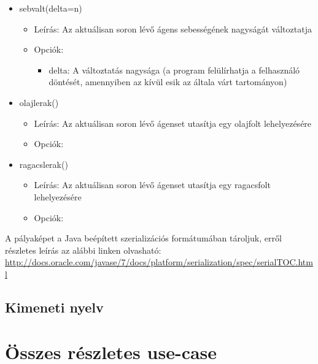 \begin{itemize}
    \item sebvalt(delta=n)
    \begin{itemize}
        \item Leírás: Az aktuálisan soron lévő ágens sebességének nagyságát változtatja
        \item Opciók: 
            \begin{itemize}
                \item delta: A változtatás nagysága (a program felülírhatja a felhasználó döntését, amennyiben az kívül esik az általa várt tartományon) 
            \end{itemize}
    \end{itemize}

    \item olajlerak()
    \begin{itemize}
        \item Leírás: Az aktuálisan soron lévő ágenset utasítja egy olajfolt lehelyezésére
        \item Opciók: 
    \end{itemize}

    \item ragacslerak()
    \begin{itemize}
        \item Leírás: Az aktuálisan soron lévő ágenset utasítja egy ragacsfolt lehelyezésére
        \item Opciók: 
    \end{itemize}

\end{itemize}

\noindent A pályaképet a Java beépített szerializációs formátumában tároljuk, erről részletes leírás az alábbi linken olvasható:\\
\url{http://docs.oracle.com/javase/7/docs/platform/serialization/spec/serialTOC.html}

\subsection{Kimeneti nyelv}

\section{Összes részletes use-case}

